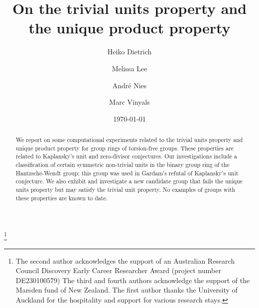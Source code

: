 \documentclass[11pt]{amsart}
\theoremstyle{mythm}
\theoremstyle{mydef}
\theoremstyle{myrem}
\numberwithin{equation}{section}
\begin{document}
\title{On the trivial units property and the unique product property}
\subjclass[2000]{} 
\author[H. Dietrich]{Heiko Dietrich}
\author[M. Lee]{Melissa Lee}
\author[A. Nies]{Andr\'e Nies}
\author[M. Vinyals]{Marc Vinyals}
\address[Dietrich, Lee]{School of Mathematics, Monash University, Clayton VIC 3800, Australia}
\address[Nies, Vinyals]{School of Computer Science, University of Auckland, Auckland 1142, New Zealand} 
\thanks{The second author acknowledges the support of an Australian Research Council Discovery Early Career Researcher Award (project number DE230100579) The third and fourth authors acknowledge the support of the Marsden fund of New Zealand. The first author thanks the University of Auckland for the hospitality and support for various research stays.}
\date{\today}


\begin{abstract}
  We report on some computational experiments related to the trivial units property and unique product property for group rings of torsion-free groups. These properties are  related to   Kaplansky's unit and zero-divisor conjectures. Our investigations include a classification of certain symmetric non-trivial units in the binary group ring of the Hantzsche-Wendt group; this group was used in Gardam's refutal of Kaplansky's unit conjecture. We also exhibit and investigate a new candidate group that fails the unique units property but may satisfy the trivial unit property.  No examples of groups with these properties are known to date.
\end{abstract} 

\maketitle
\end{document}
